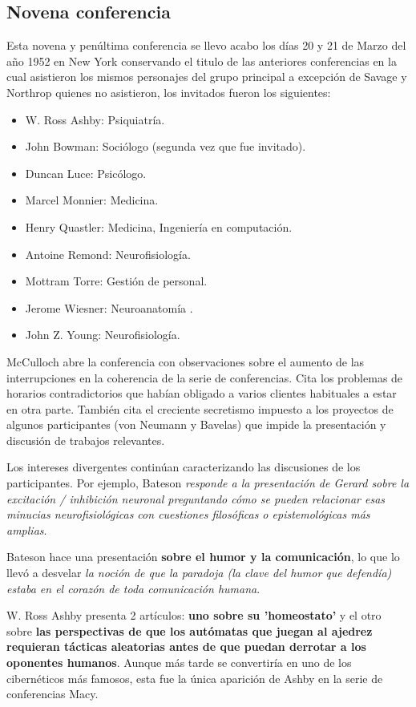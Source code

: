 \documentclass[11pt]{article}
\begin{document}
 		\subsection{Novena conferencia}
		Esta novena y penúltima conferencia se llevo acabo los días 20 y 21 de Marzo del año 1952 en New York conservando el titulo de las anteriores conferencias en la cual asistieron los mismos personajes del grupo principal a excepción de Savage y Northrop quienes no asistieron, los invitados fueron los siguientes:
		\begin{itemize}
    		\item W. Ross Ashby: Psiquiatría.
    		\item John Bowman: Sociólogo (segunda vez que fue invitado).
    		\item Duncan Luce: Psicólogo.
			\item Marcel Monnier: Medicina.
    		\item Henry Quastler: Medicina, Ingeniería en computación.
    		\item Antoine Remond: Neurofisiología.
    		\item Mottram Torre: Gestión de personal.
    		\item Jerome Wiesner: Neuroanatomía .
    		\item John Z. Young: Neurofisiología.
		\end{itemize}
 		McCulloch abre la conferencia con observaciones sobre el aumento de las interrupciones en la coherencia de la serie de conferencias. Cita los problemas de horarios contradictorios que habían obligado a varios clientes habituales a estar en otra parte. También cita el creciente secretismo impuesto a los proyectos de algunos participantes (von Neumann y Bavelas) que impide la presentación y discusión de trabajos relevantes.\par
		Los intereses divergentes continúan caracterizando las discusiones de los participantes. Por ejemplo, Bateson\textit{ responde a la presentación de Gerard sobre la excitación / inhibición neuronal preguntando cómo se pueden relacionar esas minucias neurofisiológicas con cuestiones filosóficas o epistemológicas más amplias}.\par
 		Bateson hace una presentación \textbf{sobre el humor y la comunicación}, lo que lo llevó a desvelar \textit{la noción de que la paradoja (la clave del humor que defendía) estaba en el corazón de toda comunicación humana}.\par
		W. Ross Ashby presenta 2 artículos:\textbf{ uno sobre su 'homeostato'} y el otro sobre \textbf{las perspectivas de que los autómatas que juegan al ajedrez requieran tácticas aleatorias antes de que puedan derrotar a los oponentes humanos}. Aunque más tarde se convertiría en uno de los cibernéticos más famosos, esta fue la única aparición de Ashby en la serie de conferencias Macy.\par
\end{document}
